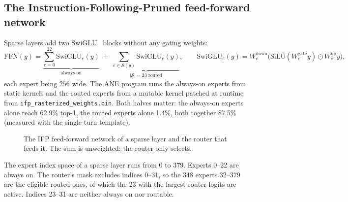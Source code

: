 \documentclass[11pt,reqno]{amsart}
\makeatletter
\newcommand{\code}[1]{\texttt{#1}}
\renewcommand\paragraph{\@startsection{paragraph}{4}\z@{.6\linespacing\@plus.2\linespacing}{-\fontdimen2\font}{\normalfont\bfseries}}
\theoremstyle{definition}
\makeatother
\begin{document}
\subsection{The Instruction-Following-Pruned feed-forward network}

Sparse layers add two SwiGLU~\cite{shazeer2020glu} blocks without any gating weights:
\[
\mathrm{FFN}(y)=\underbrace{\sum_{e=0}^{22}\mathrm{SwiGLU}_e(y)}_{\text{always on}}\;+\;\underbrace{\sum_{e\in\mathcal{S}(y)}\mathrm{SwiGLU}_e(y)}_{|\mathcal{S}|=23\text{ routed}},\qquad
\mathrm{SwiGLU}_e(y)=W^{\mathrm{down}}_e\big(\mathrm{SiLU}(W^{\mathrm{gate}}_e y)\odot W^{\mathrm{up}}_e y\big),
\]
each expert being $256$ wide. The ANE program runs the always-on experts from static kernels and the routed experts from a mutable kernel patched at runtime from \code{ifp\_rasterized\_weights.bin}. Both halves matter: the always-on experts alone reach 62.9\% top-1, the routed experts alone 1.4\%, both together 87.5\% (measured with the single-turn template).

\begin{figure}[!htbp]
\centering
{}
\caption{The IFP feed-forward network of a sparse layer and the router that feeds it. The sum is unweighted: the router only selects.}\label{fig:ifp}
\end{figure}

\paragraph{Expert indices.} The expert index space of a sparse layer runs from 0 to 379. Experts 0--22 are always on. The router's mask excludes indices 0--31, so the 348 experts 32--379 are the eligible routed ones, of which the 23 with the largest router logits are active. Indices 23--31 are neither always on nor routable.
\end{document}
